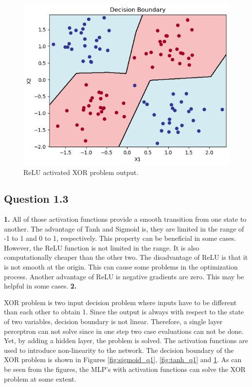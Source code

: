 \documentclass{assignment}
\begin{document}
\begin{figure}[htbp!]
    \centering
    \includegraphics[width=1\textwidth]{figures/q1_relu.png}
    \caption{ReLU activated XOR problem output.}
    \label{fig:relu_q1}
\end{figure}

\subsection{Question 1.3}
\textbf{1.}
All of those activation functions provide a smooth transition from one state to another. The advantage of Tanh and Sigmoid is, they are limited in the range of -1 to 1 and 0 to 1, respectively. This property can be beneficial in some cases. However, the ReLU function is not limited in the range. It is also computationally cheaper than the other two. The disadvantage of ReLU is that it is not smooth at the origin. This can cause some problems in the optimization process. Another advantage of ReLU is negative gradients are zero. This may be helpful in some cases. 
\textbf{2.}

XOR problem is two input decision problem where inputs have to be different than each other to obtain 1. Since the output is always with respect to the state of two variables, decision boundary is not linear. Therefore, a single layer perceptron can not solve since in one step two case evaluations can not be done. Yet, by adding a hidden layer, the problem is solved. The activation functions are used to introduce non-linearity to the network. The decision boundary of the XOR problem is shown in Figures \ref{fig:sigmoid_q1}, \ref{fig:tanh_q1} and \ref{fig:relu_q1}. As can be seen from the figures, the MLP's with activation functions can solve the XOR problem at some extent.
\end{document}
